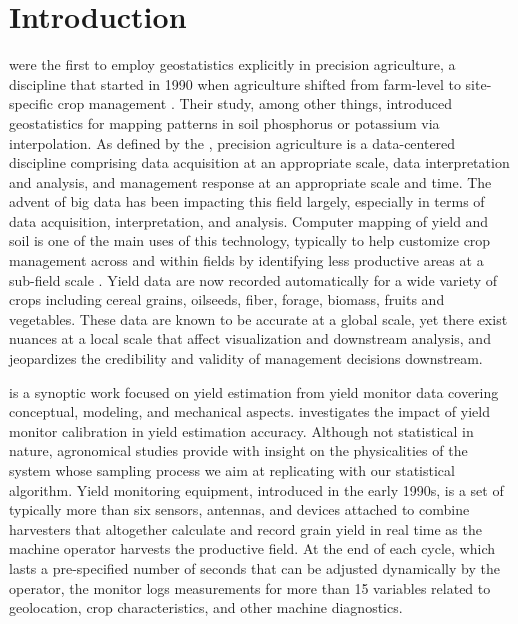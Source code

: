 \chapter{Introduction}

\cite{Miller1988} were the first to employ geostatistics explicitly in
precision agriculture, a discipline that started in 1990 when
agriculture shifted from farm-level to site-specific crop management
\citep{Oliver2010}. Their study, among other things, introduced
geostatistics for mapping patterns in soil phosphorus or potassium via
interpolation. As defined by the \citet{Council1997}, precision
agriculture is a data-centered discipline comprising data acquisition
at an appropriate scale, data interpretation and analysis, and
management response at an appropriate scale and time. The advent of
big data has been impacting this field largely, especially in terms of
data acquisition, interpretation, and analysis. Computer mapping of
yield and soil is one of the main uses of this technology, typically
to help customize crop management across and within fields by
identifying less productive areas at a sub-field scale
\citep{Lowenberg-DeBoer2019}. Yield data are now recorded
automatically for a wide variety of crops including cereal grains,
oilseeds, fiber, forage, biomass, fruits and vegetables. These data
are known to be accurate at a global scale, yet there exist nuances at
a local scale that affect visualization and downstream analysis, and
jeopardizes the credibility and validity of management decisions
downstream.

\cite{Ross2008} is a synoptic work focused on yield estimation from
yield monitor data covering conceptual, modeling, and mechanical
aspects. \cite{Arslan2002} investigates the impact of yield monitor
calibration in yield estimation accuracy. Although not statistical in
nature, agronomical studies provide with insight on the physicalities
of the system whose sampling process we aim at replicating with our
statistical algorithm. Yield monitoring equipment, introduced in the
early 1990s, is a set of typically more than six sensors, antennas,
and devices attached to combine harvesters that altogether calculate
and record grain yield in real time as the machine operator harvests
the productive field. At the end of each cycle, which lasts a
pre-specified number of seconds that can be adjusted dynamically by
the operator, the monitor logs measurements for more than 15 variables
related to geolocation, crop characteristics, and other machine
diagnostics.


